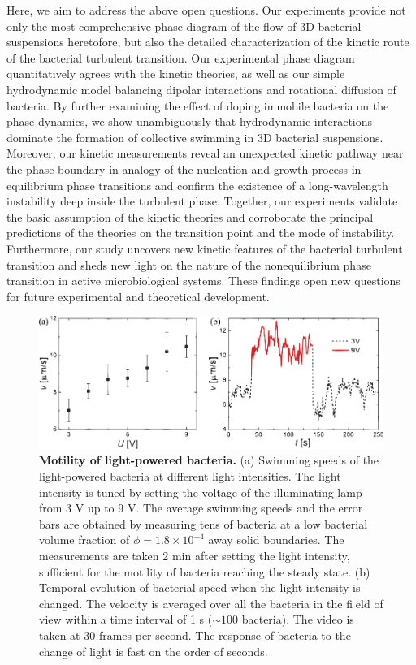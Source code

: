 Here, we aim to address the above open questions. Our experiments provide not only the most comprehensive phase diagram of the flow of 3D bacterial suspensions heretofore, but also the detailed characterization of the kinetic route of the bacterial turbulent transition. Our experimental phase diagram quantitatively agrees with the kinetic theories, as well as our simple hydrodynamic model balancing dipolar interactions and rotational diffusion of bacteria. By further examining the effect of doping immobile bacteria on the phase dynamics, we show unambiguously that hydrodynamic interactions dominate the formation of collective swimming in 3D bacterial suspensions. Moreover, our kinetic measurements reveal an unexpected kinetic pathway near the phase boundary in analogy of the nucleation and growth process in equilibrium phase transitions and confirm the existence of a long-wavelength instability deep inside the turbulent phase. Together, our experiments validate the basic assumption of the kinetic theories and corroborate the principal predictions of the theories on the transition point and the mode of instability. Furthermore, our study uncovers new kinetic features of the bacterial turbulent transition and sheds new light on the nature of the nonequilibrium phase transition in active microbiological systems. These findings open new questions for future experimental and theoretical development.

\begin{figure}[!ht]
	\begin{center}
	\includegraphics[width=5.5 in]{Figs/4-Emergence/S1.pdf}
	\end{center}
	\caption[Motility of light-powered bacteria]
	{
	\textbf{Motility of light-powered bacteria.}
  (a) Swimming speeds of the light-powered bacteria at different light intensities.
  The light intensity is tuned by setting the voltage of the illuminating lamp from 3 V up to 9 V.
  The average swimming speeds and the error bars are obtained by measuring tens of bacteria at a low bacterial volume fraction of $\phi=1.8\times 10^{-4}$ away solid boundaries. The measurements are taken 2 min after setting the light intensity, sufficient for the motility of bacteria reaching the steady state.
  (b) Temporal evolution of bacterial speed when the light intensity is changed.
  The velocity is averaged over all the bacteria in the field of view within a time interval of 1 s ($\sim 100$ bacteria).
  The video is taken at 30 frames per second. The response of bacteria to the change of light is fast on the order of seconds.
	}
	\label{fig:4-motility}
\end{figure}



